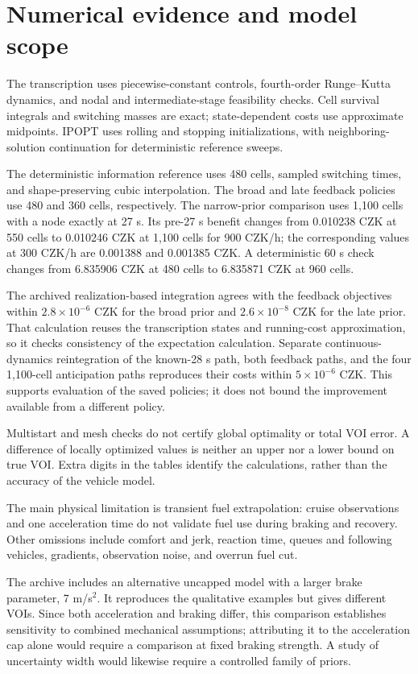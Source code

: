 \documentclass[journal,a4paper,twocolumn]{IEEEtran}
\begin{document}
\section{Numerical evidence and model scope}\label{sec:sensitivity}
The transcription uses piecewise-constant controls, fourth-order Runge--Kutta dynamics, and nodal and intermediate-stage feasibility checks. Cell survival integrals and switching masses are exact; state-dependent costs use approximate midpoints. IPOPT uses rolling and stopping initializations, with neighboring-solution continuation for deterministic reference sweeps.

The deterministic information reference uses 480 cells, sampled switching times, and shape-preserving cubic interpolation. The broad and late feedback policies use 480 and 360 cells, respectively. The narrow-prior comparison uses 1,100 cells with a node exactly at 27 s. Its pre-27 s benefit changes from 0.010238 CZK at 550 cells to 0.010246 CZK at 1,100 cells for 900 CZK/h; the corresponding values at 300 CZK/h are 0.001388 and 0.001385 CZK. A deterministic 60 s check changes from 6.835906 CZK at 480 cells to 6.835871 CZK at 960 cells.

The archived realization-based integration agrees with the feedback objectives within $2.8\times10^{-6}$ CZK for the broad prior and $2.6\times10^{-8}$ CZK for the late prior. That calculation reuses the transcription states and running-cost approximation, so it checks consistency of the expectation calculation. Separate continuous-dynamics reintegration of the known-28 s path, both feedback paths, and the four 1,100-cell anticipation paths reproduces their costs within $5\times10^{-6}$ CZK. This supports evaluation of the saved policies; it does not bound the improvement available from a different policy.

Multistart and mesh checks do not certify global optimality or total VOI error. A difference of locally optimized values is neither an upper nor a lower bound on true VOI. Extra digits in the tables identify the calculations, rather than the accuracy of the vehicle model.

The main physical limitation is transient fuel extrapolation: cruise observations and one acceleration time do not validate fuel use during braking and recovery. Other omissions include comfort and jerk, reaction time, queues and following vehicles, gradients, observation noise, and overrun fuel cut.

The archive includes an alternative uncapped model with a larger brake parameter, 7 m/s$^2$. It reproduces the qualitative examples but gives different VOIs. Since both acceleration and braking differ, this comparison establishes sensitivity to combined mechanical assumptions; attributing it to the acceleration cap alone would require a comparison at fixed braking strength. A study of uncertainty width would likewise require a controlled family of priors.
\end{document}
